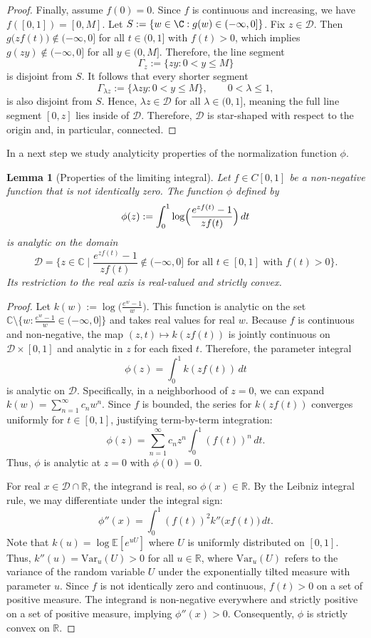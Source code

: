 \documentclass[11pt,a4paper]{scrartcl}
\numberwithin{equation}{section}
\theoremstyle{plain}
\newtheorem{lemma}{Lemma}[section]
\theoremstyle{definition}
\theoremstyle{remark}
\begin{document}
\begin{proof}
Finally, assume $f(0) = 0$. Since $f$ is continuous and increasing, we have $f([0,1])=[0,M]$. Let $S:=\{w\in\C: g(w)\in(-\infty,0]\}$. Fix $z\in \mathscr{D}$. Then $g\bigl(zf(t)\bigr)\notin(-\infty,0]$ for all $t\in(0,1]$ with $f(t)>0$, which implies $g(zy)\notin(-\infty,0]$ for all $y\in(0,M]$. Therefore, the line segment
\[
\Gamma_z:=\{zy:0<y\le M\}
\]
is disjoint from $S$. It follows that every shorter segment
\[
\Gamma_{\lambda z}:=\{\lambda zy:0<y\le M\},\qquad 0<\lambda\le 1,
\]
is also disjoint from $S$. Hence, $\lambda z\in \mathscr{D}$ for all $\lambda\in(0,1]$, meaning the full line segment $[0,z]$ lies inside of $\mathscr{D}$. Therefore, $\mathscr{D}$ is star-shaped with respect to the origin and, in particular, connected.
\end{proof}


In a next step we study analyticity properties of the normalization function $\phi$.

\begin{lemma}[Properties of the limiting integral]\label{lem: properties of eta_f}
Let $f \in C[0,1]$ be a non-negative function that is not identically zero. The function $\phi$ defined by
\[
\phi(z) := \int_0^1 \log\Bigl(\frac{e^{zf(t)}-1}{zf(t)}\Bigr)\,dt
\]
is analytic on the domain 
$$
\mathscr{D} = \{z \in \mathbb{C} \mid \frac{e^{zf(t)}-1}{zf(t)} \notin (-\infty, 0] \text{ for all } t \in [0, 1] \text{ with } f(t) > 0\}.
$$
Its restriction to the real axis is real-valued and strictly convex.
\end{lemma}
\begin{proof}
Let $k(w) := \log\bigl(\frac{e^w-1}{w}\bigr)$. This function is analytic on the set $\mathbb{C} \setminus \{w : \frac{e^w-1}{w} \in (-\infty, 0]\}$ and takes real values for real $w$. Because $f$ is continuous and non-negative, the map $(z,t) \mapsto k(zf(t))$ is jointly continuous on $\mathscr{D} \times [0,1]$ and analytic in $z$ for each fixed $t$. Therefore, the parameter integral
\[
\phi(z) = \int_0^1 k(zf(t))\,dt
\]
is analytic on $\mathscr{D}$. Specifically, in a neighborhood of $z=0$, we can expand $k(w) = \sum_{n=1}^{\infty} c_n w^{n}$. Since $f$ is bounded, the series for $k(z f(t))$ converges uniformly for $t\in[0,1]$, justifying term-by-term integration:
\[
\phi(z) = \sum_{n=1}^{\infty} c_n z^{n} \int_{0}^{1} (f(t))^{n}\,dt.
\]
Thus, $\phi$ is analytic at $z=0$ with $\phi(0)=0$.

For real $x \in \mathscr{D} \cap \mathbb{R}$, the integrand is real, so $\phi(x) \in \mathbb{R}$. By the  Leibniz integral rule, we may differentiate under the integral sign:
\[
\phi''(x) = \int_0^1 (f(t))^2 k''\bigl(x f(t)\bigr)\,dt.
\]
Note that $k(u) = \log \mathbb{E}[e^{uU}]$ where $U$ is uniformly distributed on $[0,1]$. Thus, $k''(u) = \text{Var}_u(U) > 0$ for all $u \in \mathbb{R}$, where $\text{Var}_u(U)$ refers to the variance of the random variable $U$ under the exponentially tilted measure with parameter $u$. Since $f$ is not identically zero and continuous, $f(t) > 0$ on a set of positive measure. The integrand is non-negative everywhere and strictly positive on a set of positive measure, implying $\phi''(x) > 0$. Consequently, $\phi$ is strictly convex on $\mathbb{R}$.
\end{proof}
\end{document}
